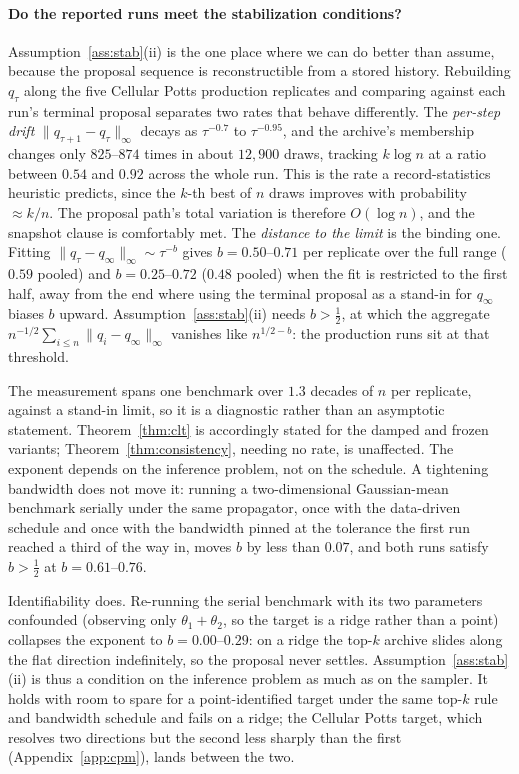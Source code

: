 \documentclass[10pt]{article}
\theoremstyle{plain}
\theoremstyle{definition}
\begin{document}
\paragraph{Do the reported runs meet the stabilization conditions?} Assumption~\ref{ass:stab}(ii) is the one place where we can do better than assume, because the proposal sequence is reconstructible from a stored history. Rebuilding $q_\tau$ along the five Cellular Potts production replicates and comparing against each run's terminal proposal separates two rates that behave differently. The \emph{per-step drift} $\|q_{\tau+1}-q_\tau\|_\infty$ decays as $\tau^{-0.7}$ to $\tau^{-0.95}$, and the archive's membership changes only $825$--$874$ times in about $12{,}900$ draws, tracking $k\log n$ at a ratio between $0.54$ and $0.92$ across the whole run. This is the rate a record-statistics heuristic predicts, since the $k$-th best of $n$ draws improves with probability ${\approx}k/n$. The proposal path's total variation is therefore $O(\log n)$, and the snapshot clause is comfortably met. The \emph{distance to the limit} is the binding one. Fitting $\|q_\tau-q_\infty\|_\infty\sim\tau^{-b}$ gives $b=0.50$--$0.71$ per replicate over the full range ($0.59$ pooled) and $b=0.25$--$0.72$ ($0.48$ pooled) when the fit is restricted to the first half, away from the end where using the terminal proposal as a stand-in for $q_\infty$ biases $b$ upward. Assumption~\ref{ass:stab}(ii) needs $b>\tfrac12$, at which the aggregate $n^{-1/2}\sum_{i\le n}\|q_i-q_\infty\|_\infty$ vanishes like $n^{1/2-b}$: the production runs sit at that threshold.

The measurement spans one benchmark over $1.3$ decades of $n$ per replicate, against a stand-in limit, so it is a diagnostic rather than an asymptotic statement. Theorem~\ref{thm:clt} is accordingly stated for the damped and frozen variants; Theorem~\ref{thm:consistency}, needing no rate, is unaffected. The exponent depends on the inference problem, not on the schedule. A tightening bandwidth does not move it: running a two-dimensional Gaussian-mean benchmark serially under the same propagator, once with the data-driven schedule and once with the bandwidth pinned at the tolerance the first run reached a third of the way in, moves $b$ by less than $0.07$, and both runs satisfy $b>\tfrac12$ at $b=0.61$--$0.76$.

Identifiability does. Re-running the serial benchmark with its two parameters confounded (observing only $\theta_1+\theta_2$, so the target is a ridge rather than a point) collapses the exponent to $b=0.00$--$0.29$: on a ridge the top-$k$ archive slides along the flat direction indefinitely, so the proposal never settles. Assumption~\ref{ass:stab}(ii) is thus a condition on the inference problem as much as on the sampler. It holds with room to spare for a point-identified target under the same top-$k$ rule and bandwidth schedule and fails on a ridge; the Cellular Potts target, which resolves two directions but the second less sharply than the first (Appendix~\ref{app:cpm}), lands between the two.
\end{document}
